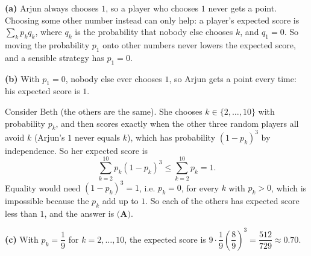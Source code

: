 \textbf{(a)} Arjun always chooses $1$, so a player who chooses $1$ never gets a point. Choosing some other number instead can only help: a player's expected score is $\sum_k p_k q_k$, where $q_k$ is the probability that nobody else chooses $k$, and $q_1=0$. So moving the probability $p_1$ onto other numbers never lowers the expected score, and a sensible strategy has $p_1=0$.

\textbf{(b)} With $p_1=0$, nobody else ever chooses $1$, so Arjun gets a point every time: his expected score is $1$.

Consider Beth (the others are the same). She chooses $k\in\{2,\dots,10\}$ with probability $p_k$, and then scores exactly when the other three random players all avoid $k$ (Arjun's $1$ never equals $k$), which has probability $(1-p_k)^3$ by independence. So her expected score is
\[\sum_{k=2}^{10}p_k(1-p_k)^3\le\sum_{k=2}^{10}p_k=1.\]
Equality would need $(1-p_k)^3=1$, i.e. $p_k=0$, for every $k$ with $p_k>0$, which is impossible because the $p_k$ add up to $1$. So each of the others has expected score less than $1$, and the answer is $\boxed{\textbf{(A)}}$.

\textbf{(c)} With $p_k=\dfrac19$ for $k=2,\dots,10$, the expected score is $9\cdot\dfrac19\left(\dfrac89\right)^3=\boxed{\dfrac{512}{729}}\approx0.70$.
